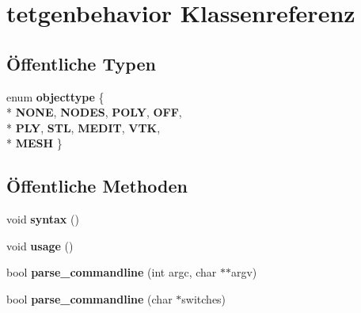 \hypertarget{classtetgenbehavior}{\section{tetgenbehavior Klassenreferenz}
\label{classtetgenbehavior}
}
\subsection*{Öffentliche Typen}
\begin{DoxyCompactItemize}
\item 
enum {\bfseries objecttype} \{ \\*
{\bfseries N\-O\-N\-E}, 
{\bfseries N\-O\-D\-E\-S}, 
{\bfseries P\-O\-L\-Y}, 
{\bfseries O\-F\-F}, 
\\*
{\bfseries P\-L\-Y}, 
{\bfseries S\-T\-L}, 
{\bfseries M\-E\-D\-I\-T}, 
{\bfseries V\-T\-K}, 
\\*
{\bfseries M\-E\-S\-H}
 \}
\end{DoxyCompactItemize}
\subsection*{Öffentliche Methoden}
\begin{DoxyCompactItemize}
\item 
\hypertarget{classtetgenbehavior_a6e22cb6ec468a3b0a5fc45fcb4d9709c}{void {\bfseries syntax} ()}\label{classtetgenbehavior_a6e22cb6ec468a3b0a5fc45fcb4d9709c}

\item 
\hypertarget{classtetgenbehavior_aa0bf59fe9ca35269d58e5f1ee10aca05}{void {\bfseries usage} ()}\label{classtetgenbehavior_aa0bf59fe9ca35269d58e5f1ee10aca05}

\item 
\hypertarget{classtetgenbehavior_a240b6eb4bee021fc945ca8b01f7b7b9f}{bool {\bfseries parse\-\_\-commandline} (int argc, char $\ast$$\ast$argv)}\label{classtetgenbehavior_a240b6eb4bee021fc945ca8b01f7b7b9f}

\item 
\hypertarget{classtetgenbehavior_abf5ad80b5b6900296253c6126f667fe2}{bool {\bfseries parse\-\_\-commandline} (char $\ast$switches)}\label{classtetgenbehavior_abf5ad80b5b6900296253c6126f667fe2}

\end{DoxyCompactItemize}
